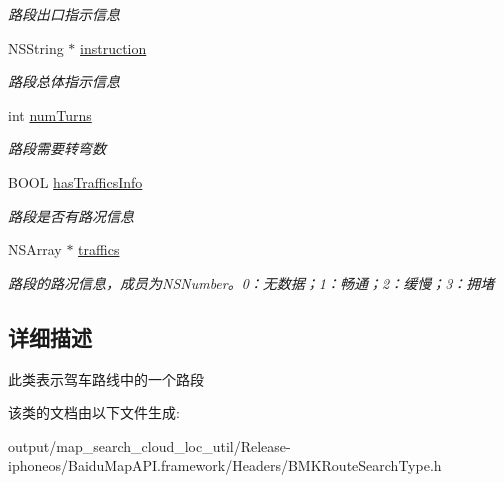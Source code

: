 \begin{DoxyCompactItemize}
\begin{DoxyCompactList}\small\item\em 路段出口指示信息 \end{DoxyCompactList}\item 
\hypertarget{interface_b_m_k_driving_step_a70a35973fdc204236c21d44770014989}{}N\+S\+String $\ast$ \hyperlink{interface_b_m_k_driving_step_a70a35973fdc204236c21d44770014989}{instruction}\label{interface_b_m_k_driving_step_a70a35973fdc204236c21d44770014989}

\begin{DoxyCompactList}\small\item\em 路段总体指示信息 \end{DoxyCompactList}\item 
\hypertarget{interface_b_m_k_driving_step_a261507960f7fcf3b6981e9a31667f47c}{}int \hyperlink{interface_b_m_k_driving_step_a261507960f7fcf3b6981e9a31667f47c}{num\+Turns}\label{interface_b_m_k_driving_step_a261507960f7fcf3b6981e9a31667f47c}

\begin{DoxyCompactList}\small\item\em 路段需要转弯数 \end{DoxyCompactList}\item 
\hypertarget{interface_b_m_k_driving_step_a1cfd822349a36e1c6e41fb08f5d7ff2f}{}B\+O\+O\+L \hyperlink{interface_b_m_k_driving_step_a1cfd822349a36e1c6e41fb08f5d7ff2f}{has\+Traffics\+Info}\label{interface_b_m_k_driving_step_a1cfd822349a36e1c6e41fb08f5d7ff2f}

\begin{DoxyCompactList}\small\item\em 路段是否有路况信息 \end{DoxyCompactList}\item 
\hypertarget{interface_b_m_k_driving_step_a7bf129fb86628f3c95fe39a268874a74}{}N\+S\+Array $\ast$ \hyperlink{interface_b_m_k_driving_step_a7bf129fb86628f3c95fe39a268874a74}{traffics}\label{interface_b_m_k_driving_step_a7bf129fb86628f3c95fe39a268874a74}

\begin{DoxyCompactList}\small\item\em 路段的路况信息，成员为\+N\+S\+Number。0：无数据；1：畅通；2：缓慢；3：拥堵 \end{DoxyCompactList}\end{DoxyCompactItemize}


\subsection{详细描述}
此类表示驾车路线中的一个路段 

该类的文档由以下文件生成\+:\begin{DoxyCompactItemize}
\item 
output/map\+\_\+search\+\_\+cloud\+\_\+loc\+\_\+util/\+Release-\/iphoneos/\+Baidu\+Map\+A\+P\+I.\+framework/\+Headers/B\+M\+K\+Route\+Search\+Type.\+h\end{DoxyCompactItemize}
